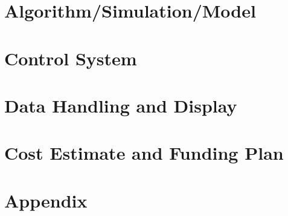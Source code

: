 \documentclass[a4paper,english,12pt]{article}
\begin{document}
\newpage
\section{Algorithm/Simulation/Model}
\label{sec:7}



\newpage
\section{Control System}
\label{sec:8}



\newpage
\section{Data Handling and Display}
\label{sec:9}



\newpage
\section{Cost Estimate and Funding Plan}
\label{sec:10}


\newpage


\newpage
{}
\appendix
\section*{Appendix}

\end{document}
